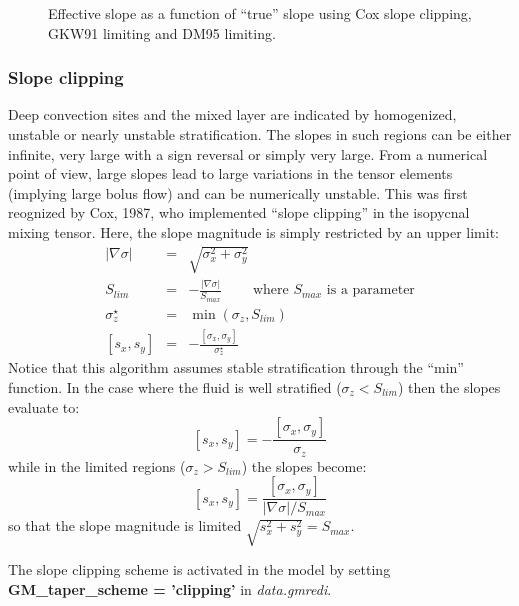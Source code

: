 \begin{figure}
\begin{center}
\end{center}
\caption{Effective slope as a function of ``true'' slope using Cox
slope clipping, GKW91 limiting and DM95 limiting.}
\label{fig:effective_slopes}
\end{figure}


\subsubsection{Slope clipping}

Deep convection sites and the mixed layer are indicated by
homogenized, unstable or nearly unstable stratification. The slopes in
such regions can be either infinite, very large with a sign reversal
or simply very large. From a numerical point of view, large slopes
lead to large variations in the tensor elements (implying large bolus
flow) and can be numerically unstable. This was first reognized by
Cox, 1987, who implemented ``slope clipping'' in the isopycnal mixing
tensor. Here, the slope magnitude is simply restricted by an upper
limit:
\begin{eqnarray}
|\nabla \sigma| & = & \sqrt{ \sigma_x^2 + \sigma_y^2 } \\
S_{lim} & = & - \frac{|\nabla \sigma|}{ S_{max} }
\;\;\;\;\;\;\;\; \mbox{where $S_{max}$ is a parameter} \\
\sigma_z^\star & = & \min( \sigma_z , S_{lim} ) \\
{[s_x,s_y]} & = & - \frac{ [\sigma_x,\sigma_y] }{\sigma_z^\star}
\end{eqnarray}
Notice that this algorithm assumes stable stratification through the
``min'' function. In the case where the fluid is well stratified ($\sigma_z < S_{lim}$) then the slopes evaluate to:
\begin{equation}
{[s_x,s_y]} = - \frac{ [\sigma_x,\sigma_y] }{\sigma_z}
\end{equation}
while in the limited regions ($\sigma_z > S_{lim}$) the slopes become:
\begin{equation}
{[s_x,s_y]} = \frac{ [\sigma_x,\sigma_y] }{|\nabla \sigma|/S_{max}}
\end{equation}
so that the slope magnitude is limited $\sqrt{s_x^2 + s_y^2} =
S_{max}$.

The slope clipping scheme is activated in the model by setting {\bf
GM\_tap\-er\_scheme = 'clipping'} in {\em data.gmredi}.

